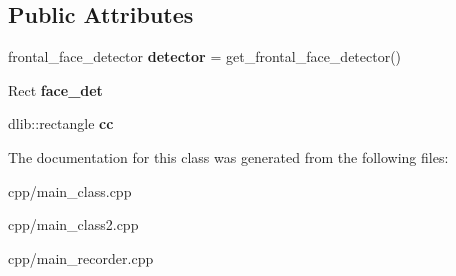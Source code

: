 \subsection*{Public Attributes}
\begin{DoxyCompactItemize}
\item 
\hypertarget{classCalibration_a1deec7e0b34f452e034f9407c26c63b3}{frontal\-\_\-face\-\_\-detector {\bfseries detector} = get\-\_\-frontal\-\_\-face\-\_\-detector()}\label{classCalibration_a1deec7e0b34f452e034f9407c26c63b3}

\item 
\hypertarget{classCalibration_a40bd656a43c1eb1f7a25e39740db8143}{Rect {\bfseries face\-\_\-det}}\label{classCalibration_a40bd656a43c1eb1f7a25e39740db8143}

\item 
\hypertarget{classCalibration_ae2628d4bc438a46a3d2d3e48ca098888}{dlib\-::rectangle {\bfseries cc}}\label{classCalibration_ae2628d4bc438a46a3d2d3e48ca098888}

\end{DoxyCompactItemize}


The documentation for this class was generated from the following files\-:\begin{DoxyCompactItemize}
\item 
cpp/main\-\_\-class.\-cpp\item 
cpp/main\-\_\-class2.\-cpp\item 
cpp/main\-\_\-recorder.\-cpp\end{DoxyCompactItemize}
